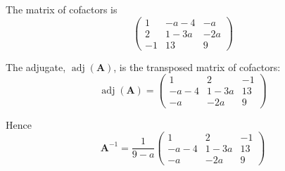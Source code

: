 \documentclass[leqno]{article}
\begin{document}
\begin{enumerate}[
  label=\textbf{\arabic*.},
  leftmargin=*,
  topsep=0pt,
  partopsep=0pt,
  parsep=0pt
]
\begin{djsSolution}
\begin{enumerate}[label=\textbf{(\alph*)}]
\begin{enumerate}[label=(\roman*)]
    The matrix of cofactors is
    \[
    \begin{pmatrix}
    1 & -a-4 & -a \\
    2 & 1-3a & -2a \\
    -1 & 13 & 9
    \end{pmatrix}
    \]

    The adjugate, \(\operatorname{adj}(\mathbf{A})\), is the transposed matrix of cofactors:
    \[
    \operatorname{adj}(\mathbf{A})=
    \begin{pmatrix}
    1 & 2 & -1 \\
    -a-4 & 1-3a & 13 \\
    -a & -2a & 9
    \end{pmatrix}
    \]

    Hence
    \[
    \mathbf{A}^{-1}=\frac{1}{9-a}
    \begin{pmatrix}
    1 & 2 & -1 \\
    -a-4 & 1-3a & 13 \\
    -a & -2a & 9
    \end{pmatrix}
    \]


\end{enumerate}
\end{enumerate}
\end{djsSolution}
\end{enumerate}
\end{document}

